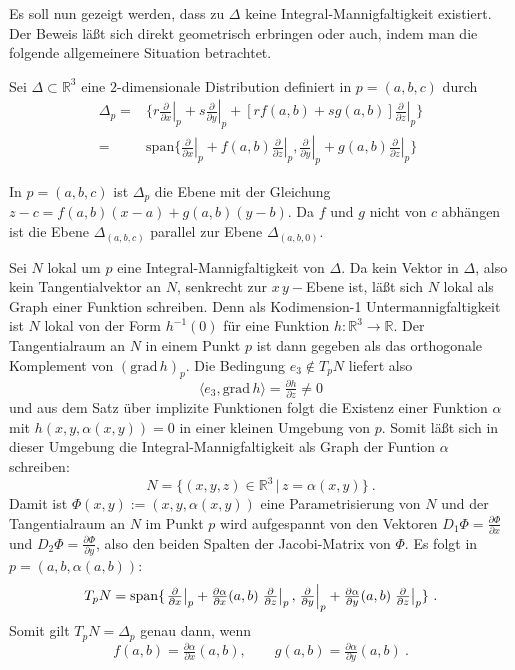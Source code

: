 \documentclass[12pt,a4paper]{article}
\def\R{\mathbb{R}}
\def\grad{\mathrm{grad}\,}
\def\la{\langle}
\def\ra{\rangle}
\begin{document}
Es soll nun gezeigt werden, dass zu $\Delta$ keine Integral-Mannigfaltigkeit existiert. Der Beweis
l\"a\ss t sich direkt geometrisch erbringen oder auch, indem man die folgende allgemeinere Situation
betrachtet.

\bigskip

Sei $\Delta \subset \R^3$ eine $2$-dimensionale Distribution definiert in $p=(a,b,c)$ durch
$$
\begin{array}{rl}
\Delta_p
= &
\{
r\left. \tfrac{\partial }{\partial x}\right|_p   + s \left. \tfrac{\partial }{\partial y}\right|_p
+ [rf(a,b) + s g(a,b)] \left. \tfrac{\partial }{\partial z}\right|_p
\}\\[1.5ex]
= &
\mathrm{span} \{
\left. \tfrac{\partial }{\partial x}\right|_p  + f(a,b) \left. \tfrac{\partial }{\partial z}\right|_p,
\left. \tfrac{\partial }{\partial y}\right|_p  + g(a,b) \left. \tfrac{\partial }{\partial z}\right|_p
\}
\end{array}
$$


In $p=(a,b,c)$ ist $\Delta_p$ die Ebene mit der Gleichung
$
z-c = f(a,b) (x-a) + g(a,b) (y-b)
$.
Da $f$ und $g$ nicht von $c$ abh\"angen ist die Ebene $\Delta_{(a,b,c)}$ parallel zur Ebene
$\Delta_{(a,b,0)}$.

\medskip

Sei $N$ lokal um $p$ eine Integral-Mannigfaltigkeit von $\Delta$. Da kein Vektor in $\Delta$,
also kein Tangentialvektor an $N$, senkrecht zur $x\,y-$Ebene ist, l\"a\ss t sich $N$ lokal als
Graph einer Funktion schreiben. Denn als Kodimension-1 Untermannigfaltigkeit ist $N$ lokal
von der Form $h^{-1}(0)$ f\"ur eine Funktion $h:\R^3\rightarrow \R$. Der Tangentialraum an
$N$ in einem Punkt $p$ ist dann gegeben als das orthogonale Komplement von $(\grad h)_p$.
Die Bedingung $e_3 \not\in T_pN$ liefert also
$$
\la e_3, \grad h\ra = \tfrac{\partial h}{\partial z} \neq 0
$$
und aus dem Satz \"uber implizite Funktionen folgt die Existenz einer Funktion $\alpha$
mit $h(x,y,\alpha(x,y))= 0$ in einer kleinen Umgebung von $p$. Somit l\"a\ss t sich in
dieser Umgebung die Integral-Mannigfaltigkeit als Graph der Funtion $\alpha$ schreiben:
$$
N = \{(x,y,z) \in \R^3 \,|\, z = \alpha(x,y)\} \ .
$$
Damit ist $\Phi(x,y) := (x,y,\alpha(x,y))$ eine Parametrisierung von $N$ und der Tangentialraum an
$N$ im Punkt $p$ wird  aufgespannt von den Vektoren $D_1\Phi = \frac{\partial \Phi}{\partial x}$
und $D_2\Phi= \frac{\partial \Phi}{\partial y}$, also den beiden Spalten der Jacobi-Matrix von $\Phi$. Es folgt
in $p=(a,b,\alpha(a,b))$:
$$
T_pN
=
\mathrm{span} \{   \left. \tfrac{\partial }{\partial x}\right|_p
+ \tfrac{\partial \alpha}{\partial x}{\small (a,b)} \left. \tfrac{\partial }{\partial z}\right|_p,
\left. \tfrac{\partial }{\partial y}\right|_p
+ \tfrac{\partial \alpha}{\partial y}(a,b)\left. \tfrac{\partial }{\partial z}\right|_p\}
\ .
$$
Somit gilt
$T_pN = \Delta_p $ genau dann, wenn
\begin{equation}\label{einstern}
f(a,b) = \tfrac{\partial \alpha}{\partial x}(a,b),\qquad g(a,b) = \tfrac{\partial \alpha}{\partial y}(a,b) \ .
\end{equation}
\end{document}
